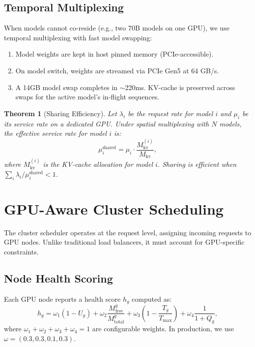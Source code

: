 \documentclass[11pt]{article}
\newtheorem{theorem}{Theorem}
\begin{document}
\subsection{Temporal Multiplexing}

When models cannot co-reside (e.g., two 70B models on one GPU), we use temporal
multiplexing with fast model swapping:
\begin{enumerate}[leftmargin=1.4em]
    \item Model weights are kept in host pinned memory (PCIe-accessible).
    \item On model switch, weights are streamed via PCIe Gen5 at 64 GB/s.
    \item A 14GB model swap completes in $\sim$220ms. KV-cache is preserved
    across swaps for the active model's in-flight sequences.
\end{enumerate}

\begin{theorem}[Sharing Efficiency]
Let $\lambda_i$ be the request rate for model $i$ and $\mu_i$ be its service
rate on a dedicated GPU. Under spatial multiplexing with $N$ models, the
effective service rate for model $i$ is:
\begin{equation}
\mu_i^{\text{shared}} = \mu_i \cdot \frac{M_{\text{kv}}^{(i)}}{M_{\text{kv}}},
\end{equation}
where $M_{\text{kv}}^{(i)}$ is the KV-cache allocation for model $i$.
Sharing is efficient when $\sum_i \lambda_i / \mu_i^{\text{shared}} < 1$.
\end{theorem}

\section{GPU-Aware Cluster Scheduling}
\label{sec:scheduling}

The cluster scheduler operates at the request level, assigning incoming requests
to GPU nodes. Unlike traditional load balancers, it must account for
GPU-specific constraints.

\subsection{Node Health Scoring}

Each GPU node reports a health score $h_g$ computed as:
\begin{equation}
h_g = \omega_1 (1 - U_g) + \omega_2 \frac{M_{\text{free}}^g}{M_{\text{total}}^g}
+ \omega_3 \left(1 - \frac{T_g}{T_{\max}}\right)
+ \omega_4 \frac{1}{1 + Q_g},
\end{equation}
where $\omega_1 + \omega_2 + \omega_3 + \omega_4 = 1$ are configurable weights.
In production, we use $\omega = (0.3, 0.3, 0.1, 0.3)$.
\end{document}
